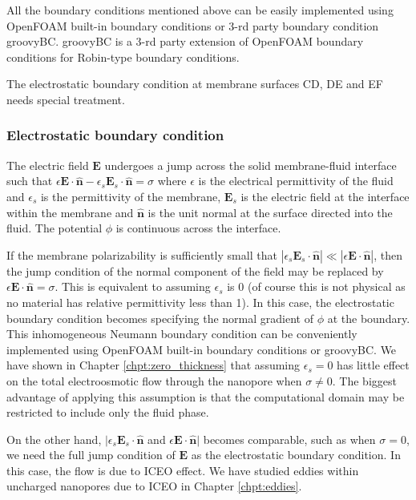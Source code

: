 All the boundary conditions mentioned above can be easily implemented using OpenFOAM built-in boundary conditions or 3-rd party boundary condition \textsf{groovyBC}. \textsf{groovyBC} is a 3-rd party extension of OpenFOAM boundary conditions for Robin-type boundary conditions.

The electrostatic boundary condition at membrane surfaces CD, DE and EF needs special treatment.

\subsubsection{Electrostatic boundary condition}
The electric field $\mathbf{E}$ undergoes a jump across the solid membrane-fluid interface such that
$\epsilon \mathbf{E} \cdot  \hat{\mathbf{n}} - \epsilon_{s} \mathbf{E}_{s} \cdot \hat{\mathbf{n}} = \sigma$ 
where $\epsilon$ is the electrical permittivity of the fluid and $\epsilon_{s}$ is the permittivity of the membrane, $\mathbf{E}_{s}$ is the electric field at the interface within the membrane and $\hat{\mathbf{n}}$ is the unit normal at the surface directed into the fluid. The potential $\phi$ is continuous across the interface. 

If the membrane polarizability is sufficiently small that $|\epsilon_{s} \mathbf{E}_{s} \cdot \hat{\mathbf{n}}|\ll|\epsilon \mathbf{E} \cdot  \hat{\mathbf{n}}|$, then the jump condition of the normal component of the field may be replaced by $\epsilon \mathbf{E} \cdot \hat{\mathbf{n}} = \sigma$. This is equivalent to assuming $\epsilon_s$ is 0 (of course this is not physical as no material has relative permittivity less than 1). In this case, the electrostatic boundary condition becomes specifying the normal gradient of $\phi$ at the boundary. This inhomogeneous Neumann boundary condition can be conveniently implemented using OpenFOAM built-in boundary conditions or \textsf{groovyBC}. We have shown in Chapter \ref{chpt:zero_thickness} that assuming $\epsilon_s=0$ has little effect on the total electroosmotic flow through the nanopore when $\sigma \neq 0$. The biggest advantage of applying this assumption is that the computational domain may be restricted to include only the fluid phase.

On the other hand, $|\epsilon_{s} \mathbf{E}_{s} \cdot \hat{\mathbf{n}}$ and $\epsilon \mathbf{E} \cdot  \hat{\mathbf{n}}|$ becomes comparable, such as when $\sigma = 0$, we need the full jump condition of $\mathbf{E}$ as the electrostatic boundary condition. In this case, the flow is due to ICEO effect. We have studied eddies within uncharged nanopores due to ICEO in Chapter \ref{chpt:eddies}. 

